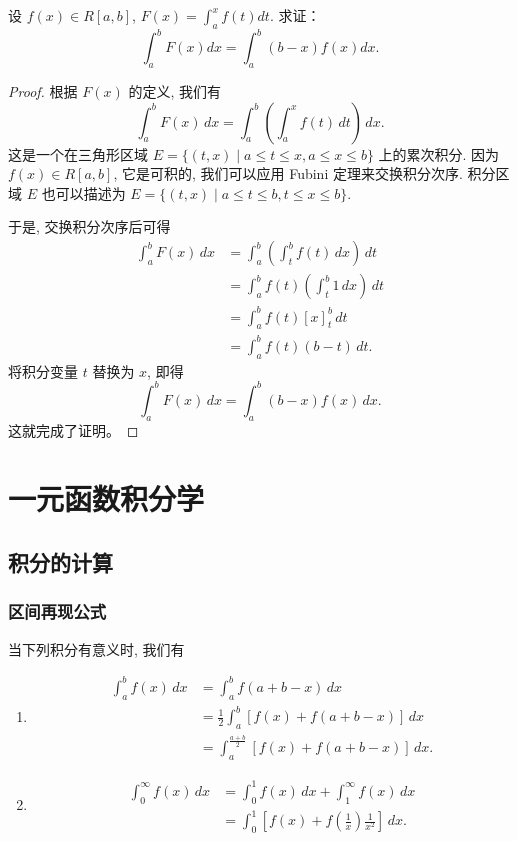 \documentclass[lang=cn,10pt,thmcnt=section]{elegantbook}
\begin{document}
\begin{example}
	设 \( f(x) \in R[a,b] \), \( F(x) = \int_{a}^{x} f(t)dt \). 求证：
\[ \int_{a}^{b} F(x)dx = \int_{a}^{b} (b-x)f(x)dx. \]
\end{example}
\begin{proof}
    根据 $F(x)$ 的定义, 我们有
    \[
        \int_a^b F(x) \, dx = \int_a^b \left( \int_a^x f(t) \, dt \right) \, dx.
    \]
    这是一个在三角形区域 $E = \{(t,x) \mid a \le t \le x, a \le x \le b \}$ 上的累次积分. 因为 $f(x) \in R[a,b]$, 它是可积的, 我们可以应用 Fubini 定理来交换积分次序. 积分区域 $E$ 也可以描述为 $E = \{(t,x) \mid a \le t \le b, t \le x \le b \}$.
    
    于是, 交换积分次序后可得
    \begin{align*}
        \int_a^b F(x) \, dx &= \int_a^b \left( \int_t^b f(t) \, dx \right) \, dt \\
        &= \int_a^b f(t) \left( \int_t^b 1 \, dx \right) \, dt \\
        &= \int_a^b f(t) [x]_t^b \, dt \\
        &= \int_a^b f(t) (b-t) \, dt.
    \end{align*}
    将积分变量 $t$ 替换为 $x$, 即得
    \[
        \int_a^b F(x) \, dx = \int_a^b (b-x)f(x) \, dx.
    \]
    这就完成了证明。
\end{proof}
\chapter{一元函数积分学}
\section{积分的计算}
\subsection{区间再现公式}
\begin{theorem}[区间再现公式]
	当下列积分有意义时, 我们有
\begin{enumerate}
    \item 
    \begin{align*}
        \int_a^b f(x) \, dx &= \int_a^b f(a+b-x) \, dx \\
        &= \frac{1}{2} \int_a^b [f(x) + f(a+b-x)] \, dx \\
        &= \int_a^{\frac{a+b}{2}} [f(x) + f(a+b-x)] \, dx.
    \end{align*}

    \item
    \begin{align*}
        \int_0^\infty f(x) \, dx &= \int_0^1 f(x) \, dx + \int_1^\infty f(x) \, dx \\
        &= \int_0^1 \left[ f(x) + f\left(\frac{1}{x}\right) \frac{1}{x^2} \right] \, dx.
    \end{align*}
\end{enumerate}
\end{theorem}
	
\end{document}
